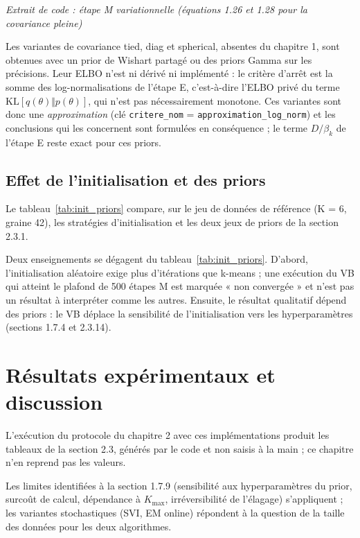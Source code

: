 \begin{center}\small\emph{Extrait de code : étape M variationnelle (équations 1.26 et 1.28 pour la covariance pleine)}\end{center}

Les variantes de covariance tied, diag et spherical, absentes du chapitre 1, sont obtenues avec un prior de Wishart partagé ou des priors Gamma sur les précisions. Leur ELBO n'est ni dérivé ni implémenté : le critère d'arrêt est la somme des log-normalisations de l'étape E, c'est-à-dire l'ELBO privé du terme $\mathrm{KL}[q(\theta)\Vert p(\theta)]$, qui n'est pas nécessairement monotone. Ces variantes sont donc une \emph{approximation} (clé \texttt{critere\_nom} = \texttt{approximation\_log\_norm}) et les conclusions qui les concernent sont formulées en conséquence ; le terme $D/\beta_k$ de l'étape E reste exact pour ces priors.

\subsection{Effet de l'initialisation et des priors}
Le tableau~\ref{tab:init_priors} compare, sur le jeu de données de référence (K = 6, graine 42), les stratégies d'initialisation et les deux jeux de priors de la section 2.3.1.

Deux enseignements se dégagent du tableau~\ref{tab:init_priors}. D'abord, l'initialisation aléatoire exige plus d'itérations que k-means ; une exécution du VB qui atteint le plafond de 500 étapes M est marquée « non convergée » et n'est pas un résultat à interpréter comme les autres. Ensuite, le résultat qualitatif dépend des priors : le VB déplace la sensibilité de l'initialisation vers les hyperparamètres (sections 1.7.4 et 2.3.14).

\section{Résultats expérimentaux et discussion}
L'exécution du protocole du chapitre 2 avec ces implémentations produit les tableaux de la section 2.3, générés par le code et non saisis à la main ; ce chapitre n'en reprend pas les valeurs.

Les limites identifiées à la section 1.7.9 (sensibilité aux hyperparamètres du prior, surcoût de calcul, dépendance à $K_{\max}$, irréversibilité de l'élagage) s'appliquent ; les variantes stochastiques (SVI, EM online) répondent à la question de la taille des données pour les deux algorithmes.

